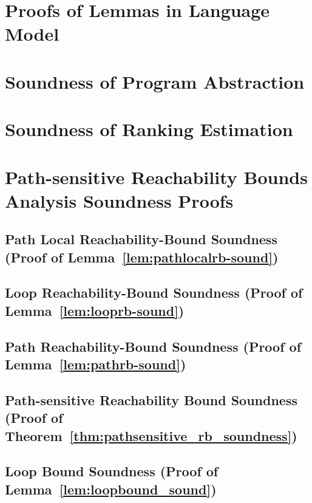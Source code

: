 \section{Proofs of Lemmas in Language Model}
\label{apdx:lem_language}

\clearpage
\section{Soundness of Program Abstraction}
\label{apdx:abs_sound}

\clearpage
\section{Soundness of Ranking Estimation}
\label{apdx:pathinsensitive_rb_soundness}

\clearpage

\section{Path-sensitive Reachability Bounds Analysis Soundness Proofs}
\label{apdx:pathsensitive_rb_soundness}

\subsection{Path Local Reachability-Bound Soundness (Proof of Lemma~\ref{lem:pathlocalrb-sound})}
\label{apdx:pathlocalrb-sound}

\clearpage

\subsection{Loop Reachability-Bound Soundness (Proof of Lemma~\ref{lem:looprb-sound})}
\label{apdx:looprb-sound}

\clearpage

\subsection{Path Reachability-Bound Soundness (Proof of Lemma~\ref{lem:pathrb-sound})}
\label{apdx:pathrb-sound}

\clearpage

\subsection{Path-sensitive Reachability Bound Soundness (Proof of Theorem~\ref{thm:pathsensitive_rb_soundness})}
\label{apdx:psrb-sound}

\clearpage

\subsection{Loop Bound Soundness (Proof of Lemma~\ref{lem:loopbound_sound})}
\label{apdx:loopbound-sound}

\clearpage

